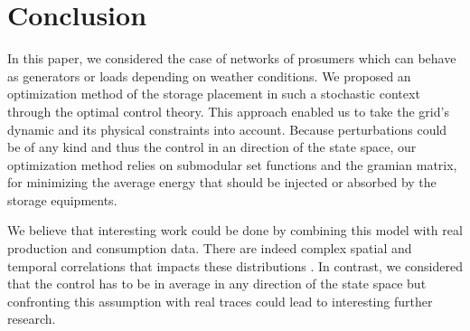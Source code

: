 \documentclass[conference]{IEEEtran}
\begin{document}
\section{Conclusion}
\label{sec:Conclusion}
In this paper, we considered the case of networks of prosumers which can behave as generators or loads depending on weather conditions. We proposed an optimization method of the storage placement in such a stochastic context through the optimal control theory. This approach enabled us to take the grid's dynamic and its physical constraints into account. Because perturbations could be of any kind and thus the control in an direction of the state space, our optimization method relies on submodular set functions and the gramian matrix, for minimizing the average energy that should be injected or absorbed by the storage equipments.

We believe that interesting work could be done by combining this model with real production and consumption data. There are indeed complex spatial and temporal correlations that impacts these distributions \cite{Gensollen2014}. In contrast, we considered that the control has to be in average in any direction of the state space but confronting this assumption with real traces could lead to interesting further research.



  

\end{document}
